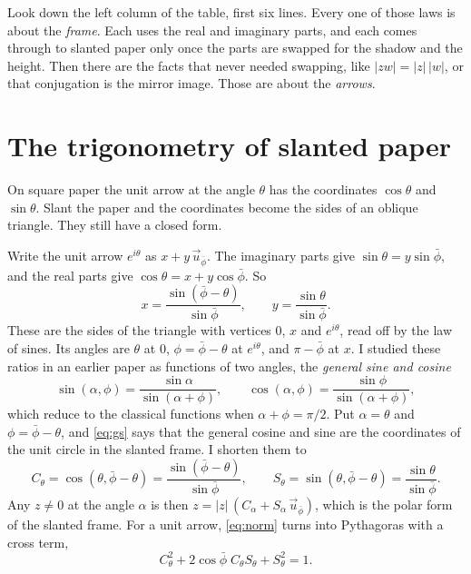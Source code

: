 \documentclass[11pt,a4paper]{article}
\theoremstyle{plain}
\theoremstyle{definition}
\newcommand{\pb}{\bar{\phi}}                     %
\newcommand{\up}{\vec{u}_{\bar{\phi}}}           %
\begin{document}
Look down the left column of the table, first six lines. Every one of those laws is about the \emph{frame}. Each uses the real and imaginary parts, and each comes through to slanted paper only once the parts are swapped for the shadow and the height. Then there are the facts that never needed swapping, like $\lvert zw\rvert = \lvert z\rvert\,\lvert w\rvert$, or that conjugation is the mirror image. Those are about the \emph{arrows}.

\section{The trigonometry of slanted paper}\label{sec:trig}

On square paper the unit arrow at the angle $\theta$ has the coordinates $\cos\theta$ and $\sin\theta$. Slant the paper and the coordinates become the sides of an oblique triangle. They still have a closed form.

Write the unit arrow $e^{i\theta}$ as $x + y\,\up$. The imaginary parts give $\sin\theta = y\sin\pb$, and the real parts give $\cos\theta = x + y\cos\pb$. So
\begin{equation}\label{eq:gs}
x = \frac{\sin(\pb - \theta)}{\sin\pb} , \qquad y = \frac{\sin\theta}{\sin\pb} .
\end{equation}
These are the sides of the triangle with vertices $0$, $x$ and $e^{i\theta}$, read off by the law of sines. Its angles are $\theta$ at $0$, $\phi = \pb - \theta$ at $e^{i\theta}$, and $\pi - \pb$ at $x$. I studied these ratios in an earlier paper \cite{DerrazGSP} as functions of two angles, the \emph{general sine and cosine}
\[
\sin(\alpha, \phi) = \frac{\sin\alpha}{\sin(\alpha + \phi)} , \qquad \cos(\alpha, \phi) = \frac{\sin\phi}{\sin(\alpha + \phi)} ,
\]
which reduce to the classical functions when $\alpha + \phi = \pi/2$. Put $\alpha = \theta$ and $\phi = \pb - \theta$, and \eqref{eq:gs} says that the general cosine and sine are the coordinates of the unit circle in the slanted frame. I shorten them to
\[
C_\theta = \cos(\theta, \pb - \theta) = \frac{\sin(\pb - \theta)}{\sin\pb} , \qquad S_\theta = \sin(\theta, \pb - \theta) = \frac{\sin\theta}{\sin\pb} .
\]
Any $z \neq 0$ at the angle $\alpha$ is then $z = \lvert z\rvert\,(C_\alpha + S_\alpha\,\up)$, which is the polar form of the slanted frame. For a unit arrow, \eqref{eq:norm} turns into Pythagoras with a cross term,
\[
C_\theta^2 + 2\cos\pb\;C_\theta S_\theta + S_\theta^2 = 1 .
\]
\end{document}
